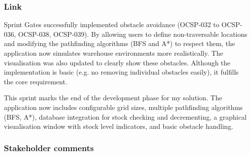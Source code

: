 \subsubsection{Link}
Sprint Gates successfully implemented obstacle avoidance (OCSP-032 to OCSP-036, OCSP-038, OCSP-039). By allowing users to define non-traversable locations and modifying the pathfinding algorithms (BFS and A*) to respect them, the application now simulates warehouse environments more realistically. The visualisation was also updated to clearly show these obstacles. Although the implementation is basic (e.g. no removing individual obstacles easily), it fulfills the core requirement.

This sprint marks the end of the development phase for my solution. The application now includes configurable grid sizes, multiple pathfinding algorithms (BFS, A*), database integration for stock checking and decrementing, a graphical visualisation window with stock level indicators, and basic obstacle handling.

\subsubsection{Stakeholder comments}





